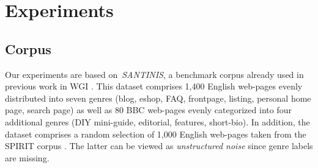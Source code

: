 \section{Experiments}\label{sec:experiments}


\subsection{Corpus}\label{sec:corpora}
Our experiments are based on~\textit{SANTINIS}, a benchmark corpus already used in previous work in WGI \cite{mehler2010genres_on_web,pritsos2018open,santini2007automatic}. This dataset comprises 1,400 English web-pages evenly distributed into seven genres (blog, eshop, FAQ, frontpage, listing, personal home page, search page) as well as 80 BBC web-pages evenly categorized into four additional genres (DIY mini-guide, editorial, features, short-bio). In addition, the dataset comprises a random selection of 1,000 English web-pages taken from the SPIRIT corpus \cite{joho2004spirit}. The latter can be viewed as \emph{unstructured noise} since genre labels are missing. 

%
